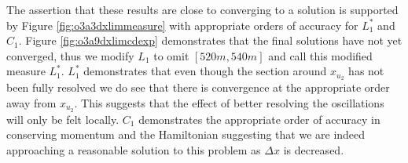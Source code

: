 \documentclass[SingleSpace,12pt,Journal]{Serre_ASCE}
\begin{document}
The assertion that these results are close to converging to a solution is supported by Figure \ref{fig:o3a3dxlimmeasure} with appropriate orders of accuracy for $L^*_1$ and $C_1$. Figure \ref{fig:o3a9dxlimcdexp} demonstrates that the final solutions have not yet converged, thus we modify $L_1$ to omit $[520m,540m]$ and call this modified measure $L^*_1$. $L^*_1$ demonstrates that even though the section around $x_{u_2}$ has not been fully resolved we do see that there is convergence at the appropriate order away from $x_{u_2}$. This suggests that the effect of better resolving the oscillations will only be felt locally. $C_1$ demonstrates the appropriate order of accuracy in conserving momentum and the Hamiltonian suggesting that we are indeed approaching a reasonable solution to this problem as $\Delta x$ is decreased. 
\end{document}

